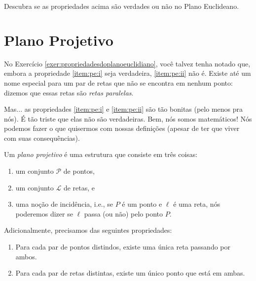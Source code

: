 \begin{exer} \label{exer:propriedadesdoplanoeuclidiano}
	Descubra se as propriedades acima são verdades ou não no Plano Euclideano.
\end{exer}

\section{Plano Projetivo}

No Exercício \ref{exer:propriedadesdoplanoeuclidiano}, você talvez tenha notado que, embora a propriedade \ref{item:pe:i} seja verdadeira, \ref{item:pe:ii} não é.
Existe até um nome especial para um par de retas que não se encontra em nenhum ponto: dizemos que essas retas são \emph{retas paralelas}.



Mas... as propriedades \ref{item:pe:i} e \ref{item:pe:ii} são tão bonitas (pelo menos pra nós).
É tão triste que elas não são verdadeiras.
Bem, nós somos matemáticos!
Nós podemos fazer o que quisermos com nossas definições (apesar de ter que viver com suas consequências).

\begin{pdefn} \label{pdefn:planoprojetivo}
	Um \emph{plano projetivo} é uma estrutura que consiste em três coisas:
	\begin{enumerate}[label = \textbullet]
		\item um conjunto \(\mathcal P\) de pontos,
		\item um conjunto \(\mathcal L\) de retas, e
		\item uma noção de incidência, i.e., se \(P\) é um ponto e \(\ell\) é uma reta, nós poderemos dizer se \(\ell\) passa (ou não) pelo ponto \(P\).
	\end{enumerate}

	Adicionalmente, precisamos das seguintes propriedades:
	\begin{enumerate}[label = (\textit{\roman*})]
		\item Para cada par de pontos distindos, existe uma única reta passando por ambos. \label{item:pp:i}
		\item Para cada par de retas distintas, existe um único ponto que está em ambas. \label{item:pp:ii}
	\end{enumerate}
\end{pdefn}


